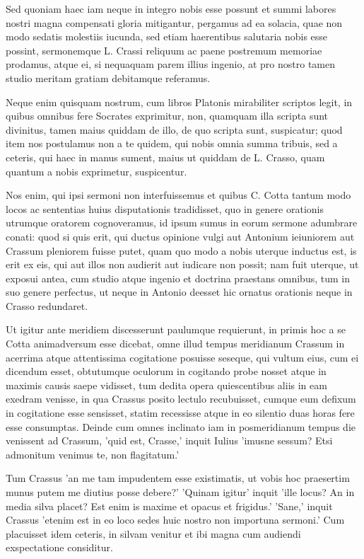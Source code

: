  Sed quoniam haec iam neque in integro nobis esse possunt et summi labores nostri magna compensati gloria mitigantur, pergamus ad ea solacia, quae non modo sedatis molestiis iucunda, sed etiam haerentibus salutaria nobis esse possint, sermonemque L. Crassi reliquum ac paene postremum memoriae prodamus, atque ei, si nequaquam parem illius ingenio, at pro nostro tamen studio meritam gratiam debitamque referamus.

 Neque enim quisquam nostrum, cum libros Platonis mirabiliter scriptos legit, in quibus omnibus fere Socrates exprimitur, non, quamquam illa scripta sunt divinitus, tamen maius quiddam de illo, de quo scripta sunt, suspicatur; quod item nos postulamus non a te quidem, qui nobis omnia summa tribuis, sed a ceteris, qui haec in manus sument, maius ut quiddam de L. Crasso, quam quantum a nobis exprimetur, suspicentur.

 Nos enim, qui ipsi sermoni non interfuissemus et quibus C. Cotta tantum modo locos ac sententias huius disputationis tradidisset, quo in genere orationis utrumque oratorem cognoveramus, id ipsum sumus in eorum sermone adumbrare conati: quod si quis erit, qui ductus opinione vulgi aut Antonium ieiuniorem aut Crassum pleniorem fuisse putet, quam quo modo a nobis uterque inductus est, is erit ex eis, qui aut illos non audierit aut iudicare non possit; nam fuit uterque, ut exposui antea, cum studio atque ingenio et doctrina praestans omnibus, tum in suo genere perfectus, ut neque in Antonio deesset hic ornatus orationis neque in Crasso redundaret.

 Ut igitur ante meridiem discesserunt paulumque requierunt, in primis hoc a se Cotta animadversum esse dicebat, omne illud tempus meridianum Crassum in acerrima atque attentissima cogitatione posuisse seseque, qui vultum eius, cum ei dicendum esset, obtutumque oculorum in cogitando probe nosset atque in maximis causis saepe vidisset, tum dedita opera quiescentibus aliis in eam exedram venisse, in qua Crassus posito lectulo recubuisset, cumque eum defixum in cogitatione esse sensisset, statim recessisse atque in eo silentio duas horas fere esse consumptas. Deinde cum omnes inclinato iam in posmeridianum tempus die venissent ad Crassum, 'quid est, Crasse,' inquit Iulius 'imusne sessum? Etsi admonitum venimus te, non flagitatum.'

 Tum Crassus 'an me tam impudentem esse existimatis, ut vobis hoc praesertim munus putem me diutius posse debere?' 'Quinam igitur' inquit 'ille locus? An in media silva placet? Est enim is maxime et opacus et frigidus.' 'Sane,' inquit Crassus 'etenim est in eo loco sedes huic nostro non importuna sermoni.' Cum placuisset idem ceteris, in silvam venitur et ibi magna cum audiendi exspectatione considitur.

